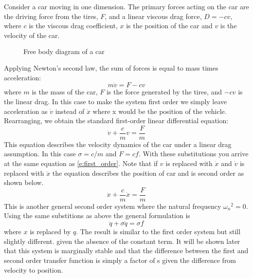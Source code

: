 Consider a car moving in one dimension. The primary forces acting on the car are the driving force from the tires, $F$, and a linear viscous drag force, $D = -cv$, where $c$ is the viscous drag coefficient, $x$ is the position of the car and $v$ is the velocity of the car.
\begin{figure}[H]
    \centering
    \caption{Free body diagram of a car}
    \label{f:car_fbd}
\end{figure}
\noindent Applying Newton's second law, the sum of forces is equal to mass times acceleration:
\begin{equation}
  m\dot{v} = F - cv
\end{equation}
where $m$ is the mass of the car, $F$ is the force generated by the tires, and $-cv$ is the linear drag. In this case to make the system first order we simply leave acceleration as $\dot{v}$ instead of $\ddot{x}$ where x would be the position of the vehicle. Rearranging, we obtain the standard first-order linear differential equation:
\begin{equation}
  \dot{v} + \frac{c}{m}v = \frac{F}{m}
\end{equation}
This equation describes the velocity dynamics of the car under a linear drag assumption. In this case $\sigma = c/m$ and $F = cf$. With these substitutions you arrive at the same equation as \ref{e:first_order}. Note that if $v$ is replaced with $\dot{x}$ and $\dot{v}$ is replaced with $\ddot{x}$ the equation describes the position of car and is second order as shown below.
\begin{equation}
    \ddot{x} + \frac{c}{m}\dot{x} = \frac{F}{m}
\end{equation}
This is another general second order system where the natural frequency ${\omega_n}^2=0$. Using the same substitions as above the general formulation is 
\begin{equation}
    \ddot{q} + \sigma \dot{q} = \sigma f
\end{equation}
where $x$ is replaced by $q$. The result is similar to the first order system but still slightly different. given the absence of the constant term. It will be shown later that this system is marginally stable and that the difference between the first and second order transfer function is simply a factor of s given the difference from velocity to position.


